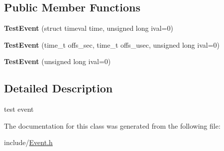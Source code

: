 \subsection*{Public Member Functions}
\begin{DoxyCompactItemize}
\item 
\mbox{\label{classTestEvent_a050904bb3bcb724cd009d33685e0c236}} 
{\bfseries Test\+Event} (struct timeval time, unsigned long ival=0)
\item 
\mbox{\label{classTestEvent_a2491c65d87b3cc9e8cdf39f5a99df868}} 
{\bfseries Test\+Event} (time\+\_\+t offs\+\_\+sec, time\+\_\+t offs\+\_\+usec, unsigned long ival=0)
\item 
\mbox{\label{classTestEvent_a02e4677cc87522c599a1c2e25ba4274b}} 
{\bfseries Test\+Event} (unsigned long ival=0)
\end{DoxyCompactItemize}


\subsection{Detailed Description}
test event 

The documentation for this class was generated from the following file\+:\begin{DoxyCompactItemize}
\item 
include/\hyperlink{Event_8h}{Event.\+h}\end{DoxyCompactItemize}
